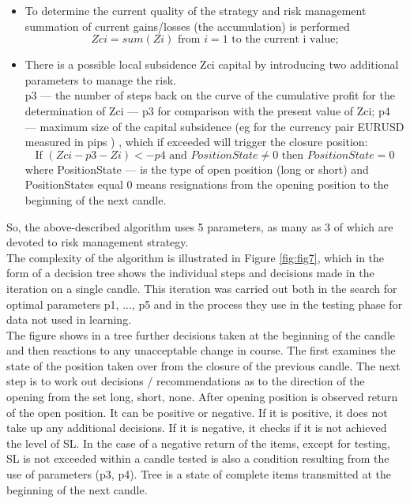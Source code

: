 \documentclass[runningheads,a4paper]{llncs}
\begin{document}
\begin{itemize}
\item To determine the current quality of the strategy and risk management summation of current gains/losses (the accumulation) is performed
\begin{equation}
Zci = sum ( Zi ) \text{ from } i = 1 \text{ to the current i value;}
\end{equation}
\item There is a possible local subsidence Zci capital by introducing two additional parameters to manage the risk.\\
p3 --- the number of steps back on the curve of the cumulative profit for the determination of Zci --- p3 for comparison with the present value of Zci;
p4 --- maximum size of the capital subsidence (eg for the currency pair EURUSD measured in pips ) , which if exceeded will trigger the closure position:\\
\begin{equation}
\text{If } ( Zci - p3 - Zi ) <- p4 \text{ and } PositionState \neq 0 \text{ then } PositionState = 0
\end{equation} 
where PositionState --- is the type of open position (long or short) and PositionStates equal 0 means resignations from the opening position to the beginning of the next candle.
\end{itemize}
So, the above-described algorithm uses 5 parameters, as many as 3 of which are devoted to risk management strategy.\\

The complexity of the algorithm is illustrated in Figure \ref{fig:fig7}, which in the form of a decision tree shows the individual steps and decisions made in the iteration on a single candle. This iteration was carried out both in the search for optimal parameters p1, ..., p5 and in the process they use in the testing phase for data not used in learning.\\

The figure shows in a tree further decisions taken at the beginning of the candle and then reactions to any unacceptable change in course. The first examines the state of the position taken over from the closure of the previous candle. The next step is to work out decisions / recommendations as to the direction of the opening from the set {long, short, none}. After opening position is observed return of the open position. It can be positive or negative. If it is positive, it does not take up any additional decisions. If it is negative, it checks if it is not achieved the level of SL. In the case of a negative return of the items, except for testing, SL is not exceeded within a candle tested is also a condition resulting from the use of parameters (p3, p4). Tree is a state of complete items transmitted at the beginning of the next candle.
\end{document}
